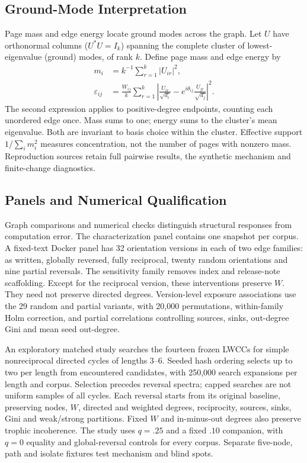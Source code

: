 \subsection{Ground-Mode Interpretation}
\label{sec:ground-mode}
Page mass and edge energy locate ground modes across the graph.
Let $U$ have orthonormal columns ($U^*U=I_k$) spanning the complete cluster of lowest-eigenvalue (ground) modes, of rank $k$.
Define page mass and edge energy by
\begin{align}
 m_i&=k^{-1}\sum_{r=1}^k|U_{ir}|^2,\\
 \varepsilon_{ij}&=\frac{W_{ij}}{k}\sum_{r=1}^k
 \left|\frac{U_{ir}}{\sqrt{d_i}}-
 e^{i\theta_{ij}}\frac{U_{jr}}{\sqrt{d_j}}\right|^2.
 \label{eq:energy}
\end{align}
The second expression applies to positive-degree endpoints, counting each
unordered edge once. Mass sums to one; energy sums to the cluster's mean
eigenvalue. Both are invariant to basis choice within the cluster. Effective
support $1/\sum_i m_i^2$ measures concentration, not the number of pages with
nonzero mass. Reproduction sources retain full pairwise results, the synthetic mechanism
and finite-change diagnostics.

\subsection{Panels and Numerical Qualification}
Graph comparisons and numerical checks distinguish structural responses from computation error.
The characterization panel contains one snapshot per corpus. A fixed-text Docker
panel has 32 orientation versions in each of two edge families: as written,
globally reversed, fully reciprocal, twenty random orientations and nine partial
reversals. The sensitivity family removes index and release-note scaffolding.
Except for the reciprocal version, these interventions preserve $W$. They need
not preserve directed degrees. Version-level exposure associations use the 29
random and partial variants, with 20,000 permutations, within-family Holm
correction, and partial correlations controlling sources, sinks, out-degree Gini
and mean seed out-degree.

An exploratory matched study searches the fourteen frozen LWCCs for simple
nonreciprocal directed cycles of lengths 3--6. Seeded hash ordering selects up
to two per length from encountered candidates, with 250,000 search expansions
per length and corpus. Selection precedes reversal spectra; capped searches
are not uniform samples of all cycles. Each reversal starts from its original
baseline, preserving nodes, $W$, directed and weighted degrees, reciprocity,
sources, sinks, Gini and weak/strong partitions. Fixed $W$ and in-minus-out
degrees also preserve trophic incoherence. The study uses $q=.25$ and a fixed $.10$
companion, with $q=0$ equality and global-reversal controls for every corpus.
Separate five-node, path and isolate fixtures test mechanism and blind spots.

